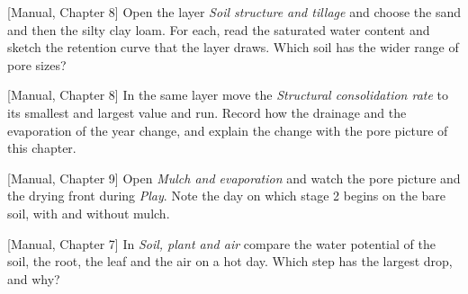 \begin{exlist}
\item {\color{khblue}[Manual, Chapter 8]} Open the layer \emph{Soil structure and tillage} and choose the sand and then the silty clay loam. For each, read the saturated water content and sketch the retention curve that the layer draws. Which soil has the wider range of pore sizes?\par{}
\item {\color{khblue}[Manual, Chapter 8]} In the same layer move the \emph{Structural consolidation rate} to its smallest and largest value and run. Record how the drainage and the evaporation of the year change, and explain the change with the pore picture of this chapter.\par{}
\item {\color{khblue}[Manual, Chapter 9]} Open \emph{Mulch and evaporation} and watch the pore picture and the drying front during \emph{Play}. Note the day on which stage 2 begins on the bare soil, with and without mulch.\par{}
\item {\color{khblue}[Manual, Chapter 7]} In \emph{Soil, plant and air} compare the water potential of the soil, the root, the leaf and the air on a hot day. Which step has the largest drop, and why?\par{}
\end{exlist}

